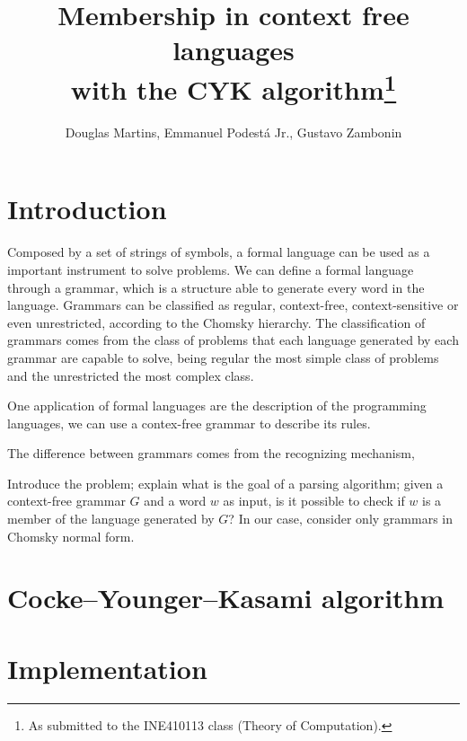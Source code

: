 \documentclass[12pt]{article}
\title{Membership in context free languages \\ with the CYK algorithm\footnote{
    As submitted to the INE410113 class (Theory of Computation).}}
\author{Douglas Martins\inst{1}, Emmanuel Podestá Jr.\inst{1}, Gustavo Zambonin\inst{1}}
\begin{document}
 

\maketitle

\section{Introduction}\label{sec:intro}
Composed by a set of strings of symbols, a formal language can be used as a important instrument to solve problems. We can define a formal language through a grammar, which is a structure able to generate every word in the language. Grammars can be classified as regular, context-free, context-sensitive or even unrestricted, according to the Chomsky hierarchy. The classification of grammars comes from the class of problems that each language generated by each grammar are capable to solve, being regular the most simple class of problems and the unrestricted the most complex class.

One application of formal languages are the description of the programming languages, we can use a contex-free grammar to describe its rules. 



The difference between grammars comes from the recognizing mechanism, 


Introduce the problem; explain what is the goal of a parsing algorithm; given a context-free grammar $G$ and a word $w$ as input, is it possible to check if $w$ is a member of the language generated by $G$? In our case, consider only grammars in Chomsky normal form.

\section{Cocke–Younger–Kasami algorithm}\label{sec:cyk}

\section{Implementation}\label{sec:imp}




\end{document}
